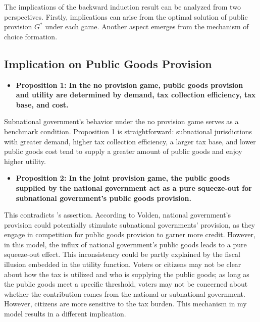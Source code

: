 \documentclass[man]{apa7}
\begin{document}
The implications of the backward induction result can be analyzed from two perspectives. Firstly, implications can arise from the optimal solution of public provision $G^*$ under each game. Another aspect emerges from the mechanism of choice formation.%

\subsection{Implication on Public Goods Provision}

\begin{itemize}
  \item \textbf{Proposition 1: In the no provision game, public goods provision and utility are determined by demand, tax collection efficiency, tax base, and cost.}
\end{itemize}

Subnational government's behavior under the no provision game serves as a benchmark condition. Proposition 1 is straightforward: subnational jurisdictions with greater demand, higher tax collection efficiency, a larger tax base, and lower public goods cost tend to supply a greater amount of public goods and enjoy higher utility.

\begin{itemize}
  \item \textbf{Proposition 2: In the joint provision game, the public goods supplied by the national government act as a pure squeeze-out for subnational government's public goods provision.}
\end{itemize}

This contradicts \Textcite{volden2007intergovernmental}'s assertion. According to Volden, national government's provision could potentially stimulate subnational governments' provision, as they engage in competition for public goods provision to garner more credit. However, in this model, the influx of national government's public goods leads to a pure squeeze-out effect. This inconsistency could be partly explained by the fiscal illusion embedded in the utility function. Voters or citizens may not be clear about how the tax is utilized and who is supplying the public goods; as long as the public goods meet a specific threshold, voters may not be concerned about whether the contribution comes from the national or subnational government. However, citizens are more sensitive to the tax burden. This mechanism in my model results in a different implication.
\end{document}
